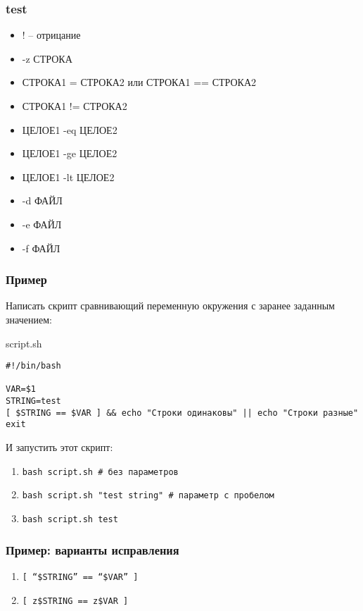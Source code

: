 \begin{frame}[fragile]
\frametitle{test}

	\begin{itemize}
	    \item ! -- отрицание
	    \item -z СТРОКА
	    \item СТРОКА1 = СТРОКА2 или  СТРОКА1 == СТРОКА2 
	    \item СТРОКА1 != СТРОКА2
	    \item ЦЕЛОЕ1 -eq ЦЕЛОЕ2
	    \item ЦЕЛОЕ1 -ge ЦЕЛОЕ2
	    \item ЦЕЛОЕ1 -lt ЦЕЛОЕ2
	    \item -d ФАЙЛ
	    \item -e ФАЙЛ
	    \item -f ФАЙЛ
	\end{itemize}

\end{frame}


\begin{frame}[fragile]
\frametitle{Пример}

	Написать скрипт сравнивающий переменную окружения с заранее заданным значением:
	
	\begin{block}{script.sh}
	\small\begin{lstlisting}
#!/bin/bash

VAR=$1
STRING=test
[ $STRING == $VAR ] && echo "Строки одинаковы" || echo "Строки разные"
exit
	\end{lstlisting}
    \end{block}
    \normalsize
	И запустить этот скрипт:
	
	\begin{enumerate}
	\item {\tt bash script.sh \# без параметров}
	\item {\tt bash script.sh "test string" \# параметр с пробелом}
	\item {\tt bash script.sh test}
        \end{enumerate}

\end{frame}

\begin{frame}
	\frametitle{Пример: варианты исправления}

		\begin{enumerate}
			\item {\tt [ ``\$STRING'' == ``\$VAR'' ] }
			\item {\tt [ z\$STRING == z\$VAR ] }
		\end{enumerate}

\end{frame}


